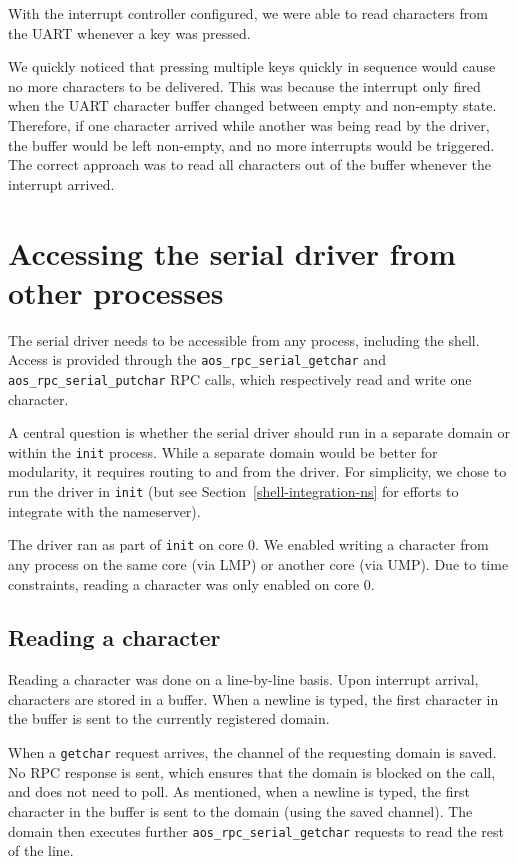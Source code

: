 With the interrupt controller configured, we were able to read characters from the UART whenever a key was pressed.

We quickly noticed that pressing multiple keys quickly in sequence would cause no more characters to be delivered.
This was because the interrupt only fired when the UART character buffer changed between empty and non-empty state.
Therefore, if one character arrived while another was being read by the driver, the buffer would be left non-empty, and no more interrupts would be triggered.
The correct approach was to read all characters out of the buffer whenever the interrupt arrived.


\section{Accessing the serial driver from other processes}

The serial driver needs to be accessible from any process, including the shell.
Access is provided through the \verb|aos_rpc_serial_getchar| and \verb|aos_rpc_serial_putchar| RPC calls, which respectively read and write one character.

A central question is whether the serial driver should run in a separate domain or within the \verb|init| process.
While a separate domain would be better for modularity, it requires routing to and from the driver.
For simplicity, we chose to run the driver in \verb|init| (but see Section~\ref{shell-integration-ns} for efforts to integrate with the nameserver).

The driver ran as part of \verb|init| on core 0.
We enabled writing a character from any process on the same core (via LMP) or another core (via UMP).
Due to time constraints, reading a character was only enabled on core 0.


\subsection{Reading a character}

Reading a character was done on a line-by-line basis.
Upon interrupt arrival, characters are stored in a buffer.
When a newline is typed, the first character in the buffer is sent to the currently registered domain.

When a \verb|getchar| request arrives, the channel of the requesting domain is saved.
No RPC response is sent, which ensures that the domain is blocked on the call, and does not need to poll.
As mentioned, when a newline is typed, the first character in the buffer is sent to the domain (using the saved channel).
The domain then executes further \verb|aos_rpc_serial_getchar| requests to read the rest of the line.

